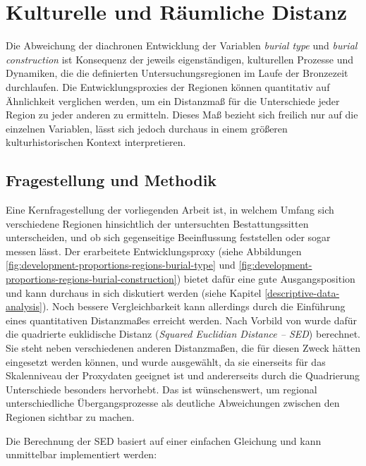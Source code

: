 \documentclass[openany,twoside,twocolumn]{book}
\begin{document}
\hypertarget{cultural-and-spatial-distance}{%
\section{Kulturelle und Räumliche
Distanz}\label{cultural-and-spatial-distance}}

Die Abweichung der diachronen Entwicklung der Variablen \emph{burial
type} und \emph{burial construction} ist Konsequenz der jeweils
eigenständigen, kulturellen Prozesse und Dynamiken, die die definierten
Untersuchungsregionen im Laufe der Bronzezeit durchlaufen. Die
Entwicklungsproxies der Regionen können quantitativ auf Ähnlichkeit
verglichen werden, um ein Distanzmaß für die Unterschiede jeder Region
zu jeder anderen zu ermitteln. Dieses Maß bezieht sich freilich nur auf
die einzelnen Variablen, lässt sich jedoch durchaus in einem größeren
kulturhistorischen Kontext interpretieren.

\hypertarget{fragestellung-und-methodik}{%
\subsection{Fragestellung und
Methodik}\label{fragestellung-und-methodik}}

Eine Kernfragestellung der vorliegenden Arbeit ist, in welchem Umfang
sich verschiedene Regionen hinsichtlich der untersuchten
Bestattungssitten unterscheiden, und ob sich gegenseitige Beeinflussung
feststellen oder sogar messen lässt. Der erarbeitete Entwicklungsproxy
(siehe Abbildungen \ref{fig:development-proportions-regions-burial-type}
und \ref{fig:development-proportions-regions-burial-construction})
bietet dafür eine gute Ausgangsposition und kann durchaus in sich
diskutiert werden (siehe Kapitel \ref{descriptive-data-analysis}). Noch
bessere Vergleichbarkeit kann allerdings durch die Einführung eines
quantitativen Distanzmaßes erreicht werden. Nach Vorbild von
\textcite{neiman_stylistic_1995} wurde dafür die quadrierte euklidische
Distanz (\emph{Squared Euclidian Distance -- SED}) berechnet. Sie steht
neben verschiedenen anderen Distanzmaßen, die für diesen Zweck hätten
eingesetzt werden können, und wurde ausgewählt, da sie einerseits für
das Skalenniveau der Proxydaten geeignet ist und andererseits durch die
Quadrierung Unterschiede besonders hervorhebt. Das ist wünschenswert, um
regional unterschiedliche Übergangsprozesse als deutliche Abweichungen
zwischen den Regionen sichtbar zu machen.

Die Berechnung der SED basiert auf einer einfachen Gleichung und kann
unmittelbar implementiert werden:
\end{document}

